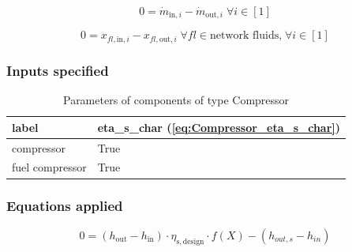 \begin{equation}
\label{eq:Compressor_mass_flow_constraints}
0=\dot{m}_{\mathrm{in,}i}-\dot{m}_{\mathrm{out,}i}\; \forall i \in [1]
\end{equation}

\begin{equation}
\label{eq:Compressor_fluid_constraints}
0=x_{fl\mathrm{,in,}i}-x_{fl\mathrm{,out,}i}\;\forall fl \in\text{network fluids,}\; \forall i \in [1]
\end{equation}


\subsubsection{Inputs specified}

\begin{table}[H]\begin{center}
\begin{tabular}{ll}
\toprule
           label &  eta\_s\_char (\ref{eq:Compressor_eta_s_char}) \\
\midrule
      compressor &                                           True \\
 fuel compressor &                                           True \\
\bottomrule
\end{tabular}
\caption{Parameters of components of type Compressor}
\end{center}\end{table}

\subsubsection{Equations applied}

\begin{equation}
\label{eq:Compressor_eta_s_char}
0=\left(h_\mathrm{out}-h_\mathrm{in}\right)\cdot\eta_\mathrm{s,design}\cdot f\left(X\right)-\left( h_{out,s} - h_{in} \right)
\end{equation}

